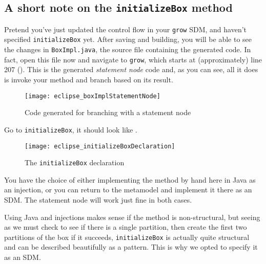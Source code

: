 \newpage
\hypertarget{initialize notes}{}
\subsection{A short note on the \texttt{initializeBox} method}
\genHeader

Pretend you've just updated the control flow in your \texttt{grow} SDM, and haven't specified \texttt{initializeBox} yet. After saving and building, you will be
able to see the changes in \texttt{BoxImpl.java}, the source file containing the generated code. In fact, open this file now and navigate to \texttt{grow},
which starts at (approximately) line 207 (). This is the generated \emph{statement node} code and, as you can see, all it does is
invoke your method and branch based on its result. 

\begin{figure}[htp]
\begin{center}
  \texttt{[image: eclipse\_boxImplStatementNode]}
  \caption{Code generated for branching with a statement node}
  \label{eclipse:initBoxImpl}
\end{center}
\end{figure}

Go to \texttt{initializeBox}, it should look like .

\begin{figure}[htp]
\begin{center}
  \texttt{[image: eclipse\_initializeBoxDeclaration]}
  \caption{The \texttt{initializeBox} declaration}
  \label{eclipse:initBoxDecl}
\end{center}
\end{figure}

You have the choice of either implementing the method by hand here in Java as an injection, or you can return to the metamodel and implement it there as an SDM.
The statement node will work just fine in both cases.

Using Java and injections makes sense if the method is non-structural, but seeing as we must check to see if there is a single partition, then create the
first two partitions of the box if it succeeds, \texttt{initializeBox} is actually quite structural and can be described beautifully as a pattern. This is why
we opted to specify it as an SDM.